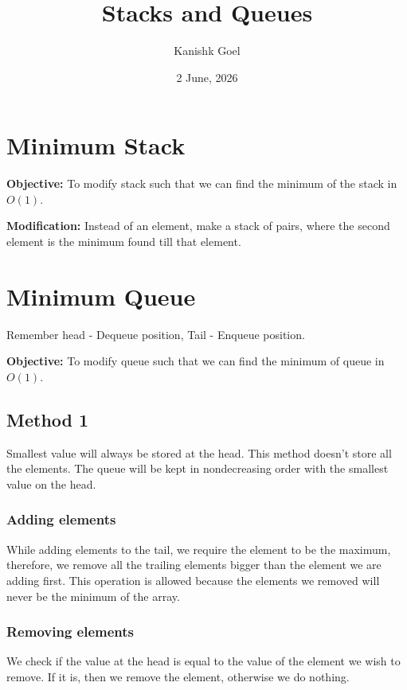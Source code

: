 \documentclass{article}
\title{Stacks and Queues}
\author{Kanishk Goel}
\date{2 June, 2026}
\begin{document}
	\SetAlgoCaptionSeparator{}
	\renewcommand{\thealgocf}{} 
	\renewcommand{\AlCapNameFnt}{\bfseries}
	\renewcommand{\AlCapFnt}{}
	\DontPrintSemicolon
	\renewcommand{\algorithmcfname}{}
	\maketitle
	\SetAlgoNoEnd
	
	\section{Minimum Stack}
	\textbf{Objective:} To modify stack such that we can find the minimum of the stack in $O(1)$. \newline
	
	\textbf{Modification: } Instead of an element, make a stack of pairs, where the second element is the minimum found till that element.
	
	\section{Minimum Queue}
	Remember head - Dequeue position, Tail - Enqueue position. \newline
	
	\textbf{Objective:} To modify queue such that we can find the minimum of queue in $O(1)$.
	\subsection{Method 1}
	Smallest value will always be stored at the head. This method doesn't store all the elements.
	The queue will be kept in nondecreasing order with the smallest value on the head.
	
	\subsubsection{Adding elements}
	While adding elements to the tail, we require the element to be the maximum, therefore, we remove all the trailing elements bigger than the element we are adding first. This operation is allowed because the elements we removed will never be the minimum of the array.
	
	\subsubsection{Removing elements} 
	We check if the value at the head is equal to the value of the element we wish to remove. If it is, then we remove the element, otherwise we do nothing.
	
\end{document}
